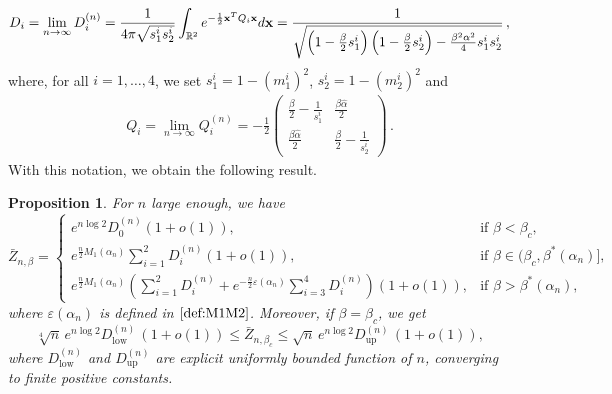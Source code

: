 \documentclass[11pt,oneside]{amsart}
\numberwithin{equation}{section}  %
\theoremstyle{plain}
\newtheorem{proposition}[theorem]{Proposition}
\theoremstyle{remark}
\begin{document}
\begin{align}\label{D-costanti}
    D_i= \lim_{n\to\infty} D_i^{(n)} = \frac{1}{4\pi \sqrt{s_1^i s_2^i}}
    \int_{\mathbb{R}^2} e^{ -\frac{1}{2} {\bf x}^T Q_i {\bf x}}d{\bf x}
 =    \frac{1}{\sqrt{ \left(1-\frac{\beta}{2}s_1^i\right)
\left(1-\frac{\beta}{2}s_2^i\right) -\frac{\beta^2\alpha^2}{4}s_1^is_2^i}}\,,
\end{align}
where, for all $i=1,\ldots,4$, we set  $s_1^i=1-(m_1^i)^2$, $s_2^i= 1-(m_2^i)^2$ and 
\begin{align*}
Q_i=\lim_{n\to\infty}   Q_i^{(n)}=     
-\frac{1}{2} 
\begin{pmatrix}
\frac{\beta}{2}-\frac{1}{s_1^i} & \frac{\beta \hat\alpha}{2}\\
\frac{\beta \hat\alpha}{2} & \frac{\beta}{2}-\frac{1}{s_2^i}
\end{pmatrix} 
\,.
\end{align*}
%
%
With this notation, we obtain the following result.
%
\begin{proposition}\label{Z_approx} 
For $n$ large enough, we have
\begin{equation*}
\bar{Z}_{n,\beta}=
\begin{cases}
e^{n\log2} D_0^{(n)}(1+o(1)), & \text{if }\beta<\beta_c, \\[5pt]
e^{\frac{n}{2} M_1(\alpha_n)} \sum_{i=1}^2 D_i^{(n)} (1+o(1)),& \text{if } \beta  \in \big(\beta_c,\beta^*(\alpha_n)\big], \\[5pt]
    e^{\frac{n}{2} M_1(\alpha_n)} \left (\sum_{i=1}^2 D_i^{(n)}+e^{-\frac{n}{2} \varepsilon(\alpha_n)} \sum_{i=3}^4 D_i^{(n)} \right ) (1+o(1)),  & \text{if } \beta>\beta^*(\alpha_n),
\end{cases} 
\end{equation*}
where $\varepsilon(\alpha_n)$ is defined in $\eqref{def:M1M2}$.
Moreover, if $\beta=\beta_c$, we get
\begin{equation}\label{Zcrit-bound}
\sqrt[4]{n} \, e^{n\log2}  D_{\text{low}}^{(n)}\,(1+o(1))\le \bar{Z}_{n,\beta_c}\le
\sqrt{n} \, e^{n\log2}  D_{\text{up}}^{(n)}\,(1+o(1)), 
\end{equation}
where $D_{\text{low}}^{(n)}$ and $D_{\text{up}}^{(n)}$ are explicit 
uniformly bounded function of $n$, converging to finite positive constants.
\end{proposition}
\end{document}
